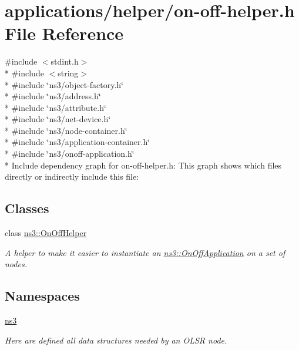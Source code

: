 \hypertarget{on-off-helper_8h}{}\section{applications/helper/on-\/off-\/helper.h File Reference}
\label{on-off-helper_8h}
{\ttfamily \#include $<$stdint.\+h$>$}\\*
{\ttfamily \#include $<$string$>$}\\*
{\ttfamily \#include \char`\"{}ns3/object-\/factory.\+h\char`\"{}}\\*
{\ttfamily \#include \char`\"{}ns3/address.\+h\char`\"{}}\\*
{\ttfamily \#include \char`\"{}ns3/attribute.\+h\char`\"{}}\\*
{\ttfamily \#include \char`\"{}ns3/net-\/device.\+h\char`\"{}}\\*
{\ttfamily \#include \char`\"{}ns3/node-\/container.\+h\char`\"{}}\\*
{\ttfamily \#include \char`\"{}ns3/application-\/container.\+h\char`\"{}}\\*
{\ttfamily \#include \char`\"{}ns3/onoff-\/application.\+h\char`\"{}}\\*
Include dependency graph for on-\/off-\/helper.h\+:
This graph shows which files directly or indirectly include this file\+:
\subsection*{Classes}
\begin{DoxyCompactItemize}
\item 
class \hyperlink{classns3_1_1OnOffHelper}{ns3\+::\+On\+Off\+Helper}
\begin{DoxyCompactList}\small\item\em A helper to make it easier to instantiate an \hyperlink{classns3_1_1OnOffApplication}{ns3\+::\+On\+Off\+Application} on a set of nodes. \end{DoxyCompactList}\end{DoxyCompactItemize}
\subsection*{Namespaces}
\begin{DoxyCompactItemize}
\item 
 \hyperlink{namespacens3}{ns3}
\begin{DoxyCompactList}\small\item\em Here are defined all data structures needed by an O\+L\+SR node. \end{DoxyCompactList}\end{DoxyCompactItemize}
